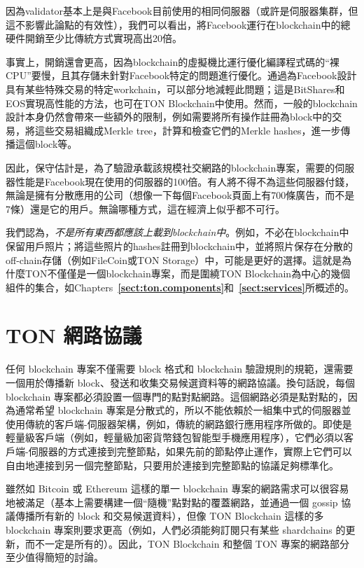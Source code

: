 \documentclass[12pt,oneside]{article}
\def\refpoint#1{{\rm\textbf{\ref{#1}}}}
\let\ptref=\refpoint
\def\mysection#1{\section{#1}\fancyhead[C]{\textsc{Chapter \textbf{\thesection.} #1}}}
\begin{document}
因為validator基本上是與Facebook目前使用的相同伺服器（或許是伺服器集群，但這不影響此論點的有效性），我們可以看出，將Facebook運行在blockchain中的總硬件開銷至少比傳統方式實現高出20倍。

事實上，開銷還會更高，因為blockchain的虛擬機比運行優化編譯程式碼的“裸CPU”要慢，且其存儲未針對Facebook特定的問題進行優化。通過為Facebook設計具有某些特殊交易的特定workchain，可以部分地減輕此問題；這是BitShares和EOS實現高性能的方法，也可在TON Blockchain中使用。然而，一般的blockchain設計本身仍然會帶來一些額外的限制，例如需要將所有操作註冊為block中的交易，將這些交易組織成Merkle tree，計算和檢查它們的Merkle hashes，進一步傳播這個block等。

因此，保守估計是，為了驗證承載該規模社交網路的blockchain專案，需要的伺服器性能是Facebook現在使用的伺服器的100倍。有人將不得不為這些伺服器付錢，無論是擁有分散應用的公司（想像一下每個Facebook頁面上有700條廣告，而不是7條）還是它的用戶。無論哪種方式，這在經濟上似乎都不可行。

我們認為，{\em 不是所有東西都應該上載到blockchain中}。例如，不必在blockchain中保留用戶照片；將這些照片的hashes註冊到blockchain中，並將照片保存在分散的off-chain存儲（例如FileCoin或TON Storage）中，可能是更好的選擇。這就是為什麼TON不僅僅是一個blockchain專案，而是圍繞TON Blockchain為中心的幾個組件的集合，如Chapters~\ptref{sect:ton.components}和~\ptref{sect:services}所概述的。


%
%
%
%

\clearpage
\mysection{TON 網路協議}\label{sect:network}

任何 blockchain 專案不僅需要 block 格式和 blockchain 驗證規則的規範，還需要一個用於傳播新 block、發送和收集交易候選資料等的網路協議。換句話說，每個 blockchain 專案都必須設置一個專門的點對點網路。這個網路必須是點對點的，因為通常希望 blockchain 專案是分散式的，所以不能依賴於一組集中式的伺服器並使用傳統的客戶端-伺服器架構，例如，傳統的網路銀行應用程序所做的。即使是輕量級客戶端（例如，輕量級加密貨幣錢包智能型手機應用程序），它們必須以客戶端-伺服器的方式連接到完整節點，如果先前的節點停止運作，實際上它們可以自由地連接到另一個完整節點，只要用於連接到完整節點的協議足夠標準化。

雖然如 Bitcoin 或 Ethereum 這樣的單一 blockchain 專案的網路需求可以很容易地被滿足（基本上需要構建一個“隨機”點對點的覆蓋網路，並通過一個 gossip 協議傳播所有新的 block 和交易候選資料），但像 TON Blockchain 這樣的多 blockchain 專案則要求更高（例如，人們必須能夠訂閱只有某些 shardchains 的更新，而不一定是所有的）。因此，TON Blockchain 和整個 TON 專案的網路部分至少值得簡短的討論。
\end{document}
